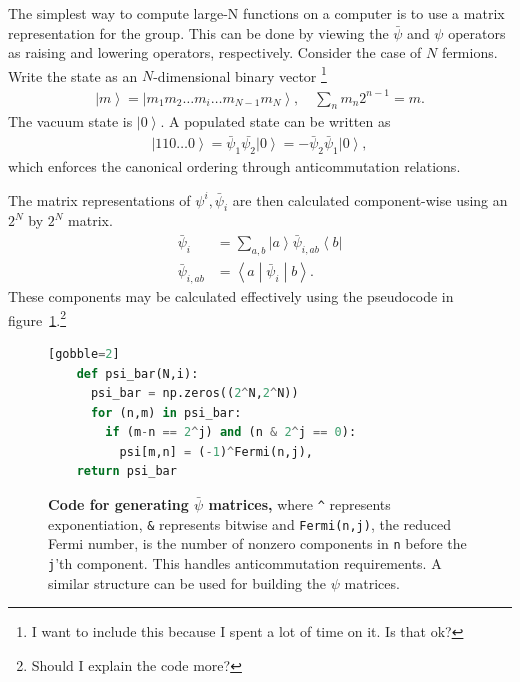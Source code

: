 \documentclass[12pt]{article} %
\newcommand{\ket}[1]{\left|#1\right\rangle}
\newcommand{\bra}[1]{\left\langle#1\right|}
\newcommand{\brakett}[3]{\left\langle#1\middle|#2\middle|#3\right\rangle}
\newcommand{\nn}{\nonumber\\}
\begin{document}
The simplest way to compute large-N functions on a computer is to use a matrix representation for the group. This can be done by viewing the $\bar \psi$ and $\psi$ operators as raising and lowering operators, respectively. Consider the case of $N$ fermions. Write the state as an $N$-dimensional binary vector \footnote{I want to include this because I spent a lot of time on it. Is that ok?}
\begin{align}
\ket{m} = \ket{m_1m_2\dots m_i\dots m_{N-1}m_N}, \quad\sum_nm_n2^{n-1} =
	m.\label{eqn:2Nstate}
\end{align}
The vacuum state is $\ket{0}$. A populated state can be written as
\begin{align}
\ket{110\dots 0} = \bar\psi_1\bar{\psi_2}\ket{0} =-\bar\psi_2\bar\psi_1\ket{0},
\end{align}
which enforces the canonical ordering through anticommutation relations. 

The matrix representations of $\psi^i, \bar \psi_i$ are then calculated component-wise using an $2^N$ by $2^N$ matrix.
\begin{align}
\bar\psi_i &= \sum_{a,b}\ket{a}\bar\psi_{i,ab}\bra{b}\nn
\bar\psi_{i,ab} &= \brakett{a}{\bar\psi_i}{b}.\label{eqn:comps}
\end{align}
These components may be calculated effectively using the pseudocode in figure~\ref{code:psibar}.\footnote{Should I explain the code more?}

\begin{figure}
	\begin{lstlisting}[language=python][gobble=2]
    def psi_bar(N,i):
      psi_bar = np.zeros((2^N,2^N))
      for (n,m) in psi_bar:
        if (m-n == 2^j) and (n & 2^j == 0): 
          psi[m,n] = (-1)^Fermi(n,j),
    return psi_bar
		\end{lstlisting}
	\cprotect\caption{\textbf{Code for generating $\bar \psi$ matrices,} where \verb|^| represents exponentiation, \verb|&| represents bitwise and \verb|Fermi(n,j)|, the reduced Fermi number, is the number of nonzero components in \verb|n| before the \verb|j|'th component. This handles anticommutation requirements. A similar structure can be used for building the $\psi$ matrices.}
	\label{code:psibar}
\end{figure}
\end{document}
